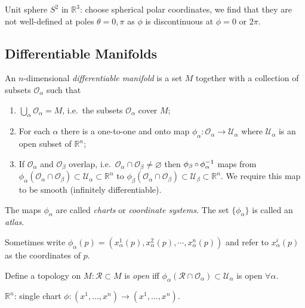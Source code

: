 \documentclass[a4paper,11pt]{article}
\begin{document}
	\begin{ex}
		Unit sphere $S^2$ in $\mathbb{R}^3$: choose spherical polar coordinates, we find that they are not well-defined at poles $\theta = 0, \pi$ as $\phi$ is discontinuous at $\phi = 0$ or $2\pi$.
	\end{ex}

	\subsection{Differentiable Manifolds}

	\begin{defi}
		An $n$-dimensional \emph{differentiable manifold} is a set $M$ together with a collection of subsets $\mathcal{O}_{\alpha}$ such that
		\begin{enumerate}
			\item $\bigcup_{\alpha} \mathcal{O}_\alpha = M$, i.e.\ the subsets $\mathcal{O}_{\alpha}$ cover $M$;
			\item For each $\alpha$ there is a one-to-one and onto map $\phi_{\alpha}: \mathcal{O}_{\alpha} \to \mathcal{U}_{\alpha}$ where $\mathcal{U}_{\alpha}$ is an open subset of $\mathbb{R}^n$;
			\item If $\mathcal{O}_{\alpha}$ and $\mathcal{O}_{\beta}$ overlap, i.e.\ $\mathcal{O}_\alpha \cap \mathcal{O}_\beta \neq \varnothing$ then $\phi_{\beta} \operatorname{\circ} \phi_{\alpha}^{-1}$ maps from $\phi_{\alpha}(\mathcal{O}_{\alpha} \cap \mathcal{O}_{\beta}) \subset \mathcal{U}_{\alpha} \subset \mathbb{R}^n$ to $\phi_{\beta}(\mathcal{O}_\alpha \cap \mathcal{O}_\beta) \subset \mathcal{U}_\beta \subset \mathbb{R}^n$. We require this map to be smooth (infinitely differentiable).    
		\end{enumerate}
		
		The maps $\phi_\alpha$ are called \emph{charts} or \emph{coordinate systems}. The set $\{\phi_\alpha\}$ is called an \emph{atlas}.
	
	\end{defi}

	Sometimes write $\phi_\alpha(p) = (x_\alpha^1 (p), x_\alpha^2 (p), \cdots, x_\alpha^n (p))$ and refer to $x^i_\alpha(p)$ as the coordinates of $p$.

	Define a topology on $M: \mathcal{R} \subset M$ is \emph{open} iff $\phi_\alpha (\mathcal{R}\cap \mathcal{O}_\alpha) \subset \mathcal{U}_{\alpha}$ is open $\forall \alpha$.  

	\begin{ex}
		$\mathbb{R}^n$: single chart $\phi: (x^1, \dots, x^n) \to (x^1, \dots, x^n)$. 
	\end{ex}
\end{document}
